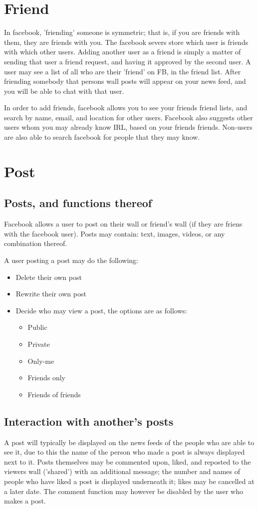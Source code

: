 \section{Friend}
In facebook, 'friending' someone is symmetric; that is, if you are friends with
them, they are friends with you. The facebook severs store which user is friends
with which other users. Adding another user as a friend is simply a matter of
sending that user a friend request, and having it approved by the second user. A
user may see a list of all who are their 'friend' on FB, in the friend list.
After friending somebody that persons wall posts will appear on your news feed,
and you will be able to chat with that user.

In order to add friends, facebook allows you to see your friends friend lists,
and search by name, email, and location for other users. Facebook also suggests
other users whom you may already know IRL, based on your friends friends.
Non-users are also able to search facebook for people that they may know.

\section{Post}
\subsection{Posts, and functions thereof}
Facebook allows a user to post on their wall or friend's wall (if they are
friens with the facebook user). Posts may contain: text, images, videos, or any
combination thereof.

A user posting a post may do the following:
\begin{itemize}
\item Delete their own post
\item Rewrite their own post
\item Decide who may view a post, the options are as follows:
    \begin{itemize}
    \item Public
    \item Private
    \item Only-me
    \item Friends only
    \item Friends of friends
    \end{itemize}
\end{itemize}

\subsection{Interaction with another's posts}
A post will typically be displayed on the news feeds of the people who are able
to see it, due to this the name of the person who made a post is always
displayed next to it. Posts themselves may be commented upon, liked, and
reposted to the viewers wall ('shared') with an additional message; the number
and names of people who have liked a post is displayed underneath it; likes may
be cancelled at a later date. The comment function may however be disabled by
the user who makes a post.

